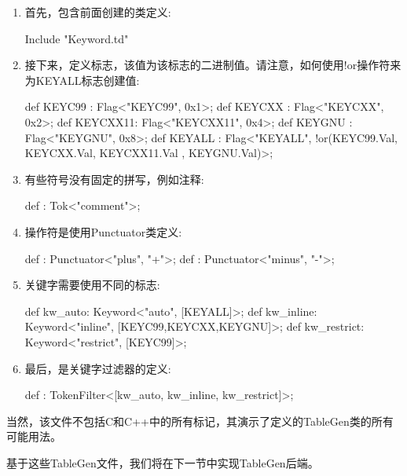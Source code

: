\begin{enumerate}
\item
首先，包含前面创建的类定义:

\begin{shell}
Include "Keyword.td"
\end{shell}

\item
接下来，定义标志，该值为该标志的二进制值。请注意，如何使用!or操作符来为KEYALL标志创建值:

\begin{shell}
def KEYC99 : Flag<"KEYC99", 0x1>;
def KEYCXX : Flag<"KEYCXX", 0x2>;
def KEYCXX11: Flag<"KEYCXX11", 0x4>;
def KEYGNU : Flag<"KEYGNU", 0x8>;
def KEYALL : Flag<"KEYALL",
                    !or(KEYC99.Val, KEYCXX.Val,
                        KEYCXX11.Val , KEYGNU.Val)>;
\end{shell}

\item
有些符号没有固定的拼写，例如注释:

\begin{shell}
def : Tok<"comment">;
\end{shell}

\item
操作符是使用Punctuator类定义:

\begin{shell}
def : Punctuator<"plus", "+">;
def : Punctuator<"minus", "-">;
\end{shell}

\item
关键字需要使用不同的标志:

\begin{shell}
def kw_auto: Keyword<"auto", [KEYALL]>;
def kw_inline: Keyword<"inline", [KEYC99,KEYCXX,KEYGNU]>;
def kw_restrict: Keyword<"restrict", [KEYC99]>;
\end{shell}

\item
最后，是关键字过滤器的定义:

\begin{shell}
def : TokenFilter<[kw_auto, kw_inline, kw_restrict]>;
\end{shell}
\end{enumerate}

当然，该文件不包括C和C++中的所有标记，其演示了定义的TableGen类的所有可能用法。

基于这些TableGen文件，我们将在下一节中实现TableGen后端。


